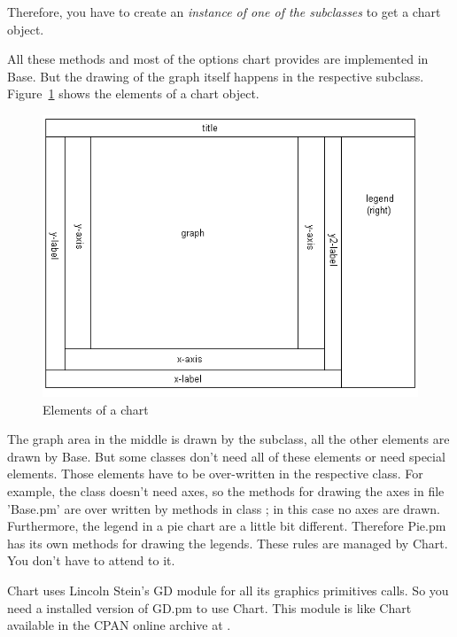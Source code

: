 Therefore, you have to create an \emph{instance of one of the subclasses} 
to get a chart object.

All these methods and most of the options chart provides are implemented in Base. 
But the drawing of the graph itself happens in the respective subclass. 
Figure~\ref{fig:Elemente} shows the elements of a chart object.

\begin{figure}[h]
	\begin{center}
		\includegraphics[scale=0.4]{Elemente.png}
	\end{center}
	\caption{Elements of a chart}
	\label{fig:Elemente}
\end{figure}

The graph area in the middle is drawn by the subclass, all the other elements are drawn by Base. 
But some classes don't need all of these elements or need special elements. 
Those elements have to be over-written in the respective class. 
For example, the class  doesn't need axes, 
so the methods for drawing the axes in file 'Base.pm' 
are over written by methods in class ; 
in this case no axes are drawn. 
Furthermore, the legend in a pie chart are a little bit different. Therefore Pie.pm has its
own methods for drawing the legends. These rules are managed by Chart. 
You don't have to attend to it. 

Chart uses Lincoln Stein's GD module for all its graphics primitives calls. 
So you need a installed version of GD.pm to use Chart. 
This module is like Chart available in the CPAN online archive at .
